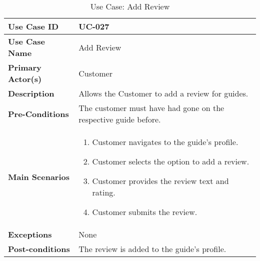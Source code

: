 \begin{table}[ht]
    \centering
    \begin{tabular}{|l|p{}|}
        \hline
        \textbf{Use Case ID} & UC-027 \\
        \hline
        \textbf{Use Case Name} & Add Review \\
        \hline
        \textbf{Primary Actor(s)} & Customer \\
        \hline
        \textbf{Description} & Allows the Customer to add a review for guides. \\
        \hline
        \textbf{Pre-Conditions} & The customer must have had gone on the respective guide before. \\
        \hline
        \textbf{Main Scenarios} & 
        \begin{enumerate}[label=\arabic*.,itemsep=0pt]
            \item Customer navigates to the guide's profile.
            \item Customer selects the option to add a review.
            \item Customer provides the review text and rating.
            \item Customer submits the review.
        \end{enumerate} \\
        \hline
        \textbf{Exceptions} & None \\
        \hline
        \textbf{Post-conditions} & The review is added to the guide's profile. \\
        \hline
    \end{tabular}
    \label{tab:use-case-add-review}
    \caption{Use Case: Add Review}
\end{table}

